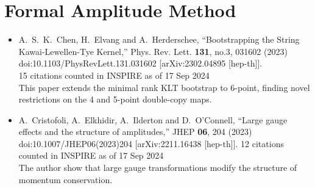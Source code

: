 \documentclass[a4paper,12pt]{article}
\begin{document}
\section*{Formal Amplitude Method}
\begin{itemize}
    \item  %
    A.~S.~K.~Chen, H.~Elvang and A.~Herderschee,
    ``Bootstrapping the String Kawai-Lewellen-Tye Kernel,''
    Phys. Rev. Lett. \textbf{131}, no.3, 031602 (2023)\\
    doi:10.1103/PhysRevLett.131.031602
    [arXiv:2302.04895 [hep-th]].\\
    15 citations counted in INSPIRE as of 17 Sep 2024\\
    This paper extends the minimal rank KLT bootstrap to 6-point, finding novel restrictions on the 4
    and 5-point double-copy maps.
    \item %
    A.~Cristofoli, A.~Elkhidir, A.~Ilderton and D.~O'Connell,
    ``Large gauge effects and the structure of amplitudes,''
    JHEP \textbf{06}, 204 (2023)
    doi:10.1007/JHEP06(2023)204
    [arXiv:2211.16438 [hep-th]].
    12 citations counted in INSPIRE as of 17 Sep 2024\\
    The author show that large gauge transformations modify the structure of momentum conservation.
\end{itemize}
\end{document}
